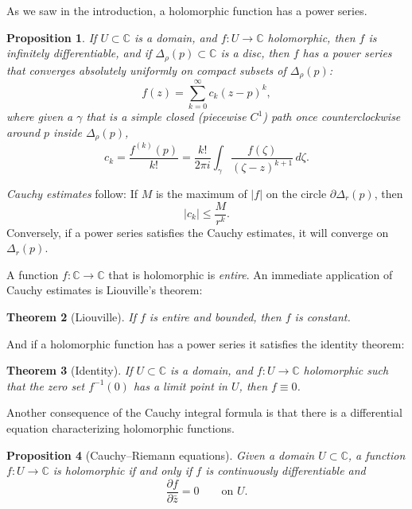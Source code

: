 \documentclass[12pt,openany]{book}
\newcommand{\sabs}[1]{\lvert {#1} \rvert}
\newcommand{\C}{{\mathbb{C}}}
\newcommand{\myindex}[1]{#1\index{#1}}
\theoremstyle{plain}
\newtheorem{thm}{Theorem}[section]
\newtheorem{prop}[thm]{Proposition}
\theoremstyle{remark}
\theoremstyle{definition}
\theoremstyle{exercise}
\theoremstyle{example}
\begin{document}
As we saw in the introduction, a holomorphic function has a power series.

\begin{prop}
If $U \subset \C$ is a domain, and $f \colon U \to \C$ holomorphic,
then $f$ is infinitely differentiable, and if $\Delta_\rho(p) \subset \C$
is a disc, then $f$ has a power series that
converges absolutely uniformly on compact subsets of $\Delta_\rho(p)$:
\begin{equation*}
f(z) = \sum_{k=0}^\infty c_k {(z-p)}^k ,
\end{equation*}
where given a $\gamma$ that is a simple closed (piecewise $C^1$)
path once counterclockwise
around $p$ inside $\Delta_\rho(p)$,
\begin{equation*}
c_k = \frac{f^{(k)}(p)}{k!} =
\frac{k!}{2\pi i}
\int_{\gamma}
\frac{f(\zeta)}{{(\zeta-z)}^{k+1}}
\,
d \zeta  .
\end{equation*}
\end{prop}

\emph{\myindex{Cauchy estimates}} follow:  If $M$
is the maximum of $\sabs{f}$ on the circle $\partial \Delta_r(p)$, then
\begin{equation*}
\sabs{c_k} \leq \frac{M}{r^k} .
\end{equation*}
Conversely, if a power series satisfies the Cauchy estimates,
it will converge on $\Delta_r(p)$.

A function $f \colon \C \to \C$ that is holomorphic is
\emph{\myindex{entire}}.  An immediate application of Cauchy estimates
is Liouville's theorem:

\begin{thm}[Liouville]
If $f$ is entire and bounded, then $f$ is constant.
\end{thm}

And if a holomorphic function has a power series it satisfies the
identity theorem:

\begin{thm}[Identity]
If $U \subset \C$ is a domain, and $f \colon U \to \C$ holomorphic
such that the zero set $f^{-1}(0)$ has a limit point in $U$, then
$f \equiv 0$.
\end{thm}

Another consequence  of the Cauchy integral formula is that there is
a differential equation characterizing holomorphic functions.

\begin{prop}[Cauchy--Riemann equations]
Given a domain $U \subset \C$,
a function $f \colon U \to \C$ is holomorphic if and only if
$f$ is continuously differentiable and
\begin{equation*}
\frac{\partial f}{\partial \bar{z}} = 0 \qquad \text{on $U$.}
\end{equation*}
\end{prop}
\end{document}
